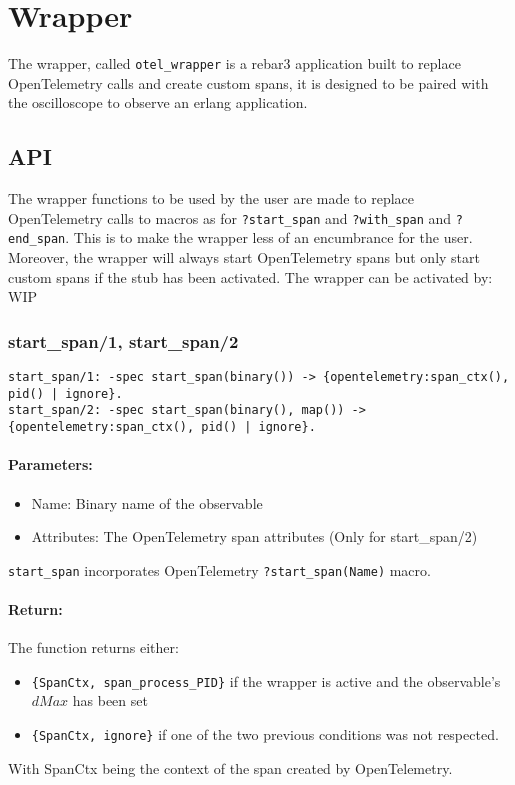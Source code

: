 \section{Wrapper}
    The wrapper, called \texttt{otel\_wrapper} is a rebar3 application built to replace OpenTelemetry calls and create custom spans, it is designed to be paired with the oscilloscope to observe an erlang application.
    
    \subsection{API}
        The wrapper functions to be used by the user are made to replace OpenTelemetry calls to macros as for \texttt{?start\_span} and \texttt{?with\_span} and \texttt{?end\_span}. This is to make the wrapper less of an encumbrance for the user. \\
        Moreover, the wrapper will always start OpenTelemetry spans but only start custom spans if the stub has been activated. The wrapper can be activated by: WIP 
        
       
        \subsubsection{start\_span/1, start\_span/2}
        
        \begin{verbatim}        
start_span/1: -spec start_span(binary()) -> {opentelemetry:span_ctx(), pid() | ignore}.
start_span/2: -spec start_span(binary(), map()) -> {opentelemetry:span_ctx(), pid() | ignore}.  
        \end{verbatim}
        
        \paragraph{Parameters:}
        \begin{itemize}
            \item Name: Binary name of the observable
            \item Attributes: The OpenTelemetry span attributes (Only for start\_span/2)
        \end{itemize} 
        
        \texttt{start\_span} incorporates OpenTelemetry \texttt{?start\_span(Name)} macro.
        
        \paragraph{Return:} 
        The function returns either:
        \begin{itemize}
            \item  \texttt{\{SpanCtx, span\_process\_PID\}} if the wrapper is active and the observable's $dMax$ has been set 
            \item \texttt{\{SpanCtx, ignore\}} if one of the two previous conditions was not respected.
        \end{itemize}
        With SpanCtx being the context of the span created by OpenTelemetry.
        
